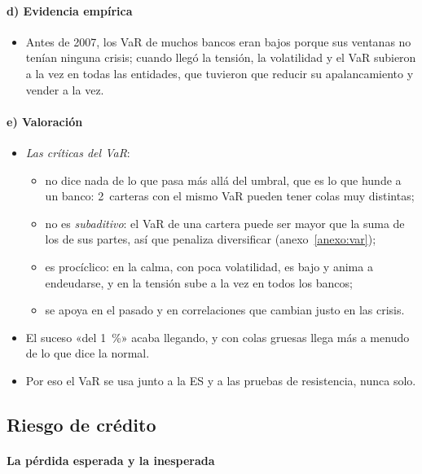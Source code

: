 \documentclass[11pt]{article}
\begin{document}
\paragraph{d) Evidencia empírica}

\begin{itemize}
\item Antes de 2007, los VaR de muchos bancos eran bajos porque sus ventanas no tenían ninguna crisis; cuando llegó la tensión, la volatilidad y el VaR subieron a la vez en todas las entidades, que tuvieron que reducir su apalancamiento y vender a la vez\nocite{AdrianShin2010}.
\end{itemize}

\paragraph{e) Valoración}

\begin{itemize}
\item \emph{Las críticas del VaR}:
  \begin{itemize}
  \item no dice nada de lo que pasa más allá del umbral, que es lo que hunde a un banco: 2~carteras con el mismo VaR pueden tener colas muy distintas;
  \item no es \emph{subaditivo}: el VaR de una cartera puede ser mayor que la suma de los de sus partes, así que penaliza diversificar (anexo~\ref{anexo:var});
  \item es procíclico: en la calma, con poca volatilidad, es bajo y anima a endeudarse, y en la tensión sube a la vez en todos los bancos\nocite{AdrianShin2010};
  \item se apoya en el pasado y en correlaciones que cambian justo en las crisis.
  \end{itemize}
\item El suceso «del 1~\%» acaba llegando, y con colas gruesas llega más a menudo de lo que dice la normal.
\item Por eso el VaR se usa junto a la ES y a las pruebas de resistencia, nunca solo.
\end{itemize}

\subsection{Riesgo de crédito}\label{sec:riesgo-credito}

\paragraph{La pérdida esperada y la inesperada}
\end{document}

